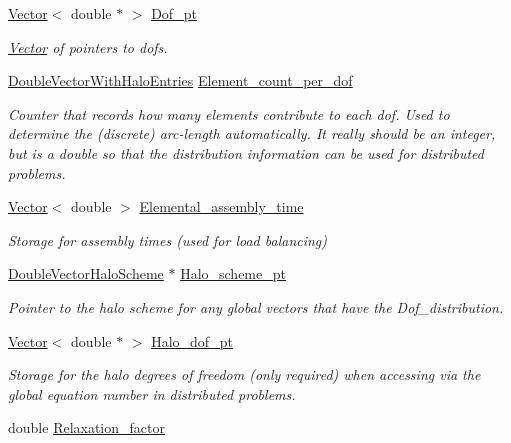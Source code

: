 \begin{DoxyCompactItemize}
\hyperlink{classoomph_1_1Vector}{Vector}$<$ double $\ast$ $>$ \hyperlink{classoomph_1_1Problem_aa9e4cfff7e1dc295036b0e58bc11ae75}{Dof\+\_\+pt}
\begin{DoxyCompactList}\small\item\em \hyperlink{classoomph_1_1Vector}{Vector} of pointers to dofs. \end{DoxyCompactList}\item 
\hyperlink{classoomph_1_1DoubleVectorWithHaloEntries}{Double\+Vector\+With\+Halo\+Entries} \hyperlink{classoomph_1_1Problem_ae4177b73a790b80d541b416d1e83c6c3}{Element\+\_\+count\+\_\+per\+\_\+dof}
\begin{DoxyCompactList}\small\item\em Counter that records how many elements contribute to each dof. Used to determine the (discrete) arc-\/length automatically. It really should be an integer, but is a double so that the distribution information can be used for distributed problems. \end{DoxyCompactList}\item 
\hyperlink{classoomph_1_1Vector}{Vector}$<$ double $>$ \hyperlink{classoomph_1_1Problem_a2b2bcde2b051f47278ccf8446699bbfb}{Elemental\+\_\+assembly\+\_\+time}
\begin{DoxyCompactList}\small\item\em Storage for assembly times (used for load balancing) \end{DoxyCompactList}\item 
\hyperlink{classoomph_1_1DoubleVectorHaloScheme}{Double\+Vector\+Halo\+Scheme} $\ast$ \hyperlink{classoomph_1_1Problem_a1dcaa04975d69c616ab294cbfaf53d55}{Halo\+\_\+scheme\+\_\+pt}
\begin{DoxyCompactList}\small\item\em Pointer to the halo scheme for any global vectors that have the Dof\+\_\+distribution. \end{DoxyCompactList}\item 
\hyperlink{classoomph_1_1Vector}{Vector}$<$ double $\ast$ $>$ \hyperlink{classoomph_1_1Problem_ac59d9163cc5d008a2ade4de8da06dbf6}{Halo\+\_\+dof\+\_\+pt}
\begin{DoxyCompactList}\small\item\em Storage for the halo degrees of freedom (only required) when accessing via the global equation number in distributed problems. \end{DoxyCompactList}\item 
double \hyperlink{classoomph_1_1Problem_a86c4feb98ec982a08dc84fb664f53abc}{Relaxation\+\_\+factor}

\end{DoxyCompactItemize}
